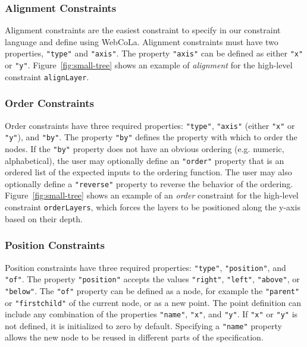 \subsubsection{Alignment Constraints}
Alignment constraints are the easiest constraint to specify in our constraint language and define using WebCoLa. Alignment constraints must have two properties, \texttt{"type"} and \texttt{"axis"}. The property \texttt{"axis"} can be defined as either \texttt{"x"} or \texttt{"y"}. Figure~\ref{fig:small-tree} shows an example of \emph{alignment} for the high-level constraint \texttt{alignLayer}.

\subsubsection{Order Constraints}
Order constraints have three required properties: \texttt{"type"}, \texttt{"axis"} (either \texttt{"x"} or \texttt{"y"}), and \texttt{"by"}. The property \texttt{"by"} defines the property with which to order the nodes. If the \texttt{"by"} property does not have an obvious ordering (e.g. numeric, alphabetical), the user may optionally define an \texttt{"order"} property that is an ordered list of the expected inputs to the ordering function. The user may also optionally define a \texttt{"reverse"} property to reverse the behavior of the ordering. Figure~\ref{fig:small-tree} shows an example of an \emph{order} constraint for the high-level constraint \texttt{orderLayers}, which forces the layers to be positioned along the y-axis based on their depth.

\subsubsection{Position Constraints}
Position constraints have three required properties: \texttt{"type"}, \texttt{"position"}, and \texttt{"of"}. The property \texttt{"position"} accepts the values \texttt{"right"}, \texttt{"left"}, \texttt{"above"}, or \texttt{"below"}. The \texttt{"of"} property can be defined as a node, for example the \texttt{"parent"} or \texttt{"firstchild"} of the current node, or as a new point. The point definition can include any combination of the properties \texttt{"name"}, \texttt{"x"}, and \texttt{"y"}. If \texttt{"x"} or \texttt{"y"} is not defined, it is initialized to zero by default. Specifying a \texttt{"name"} property allows the new node to be reused in different parts of the specification.  

